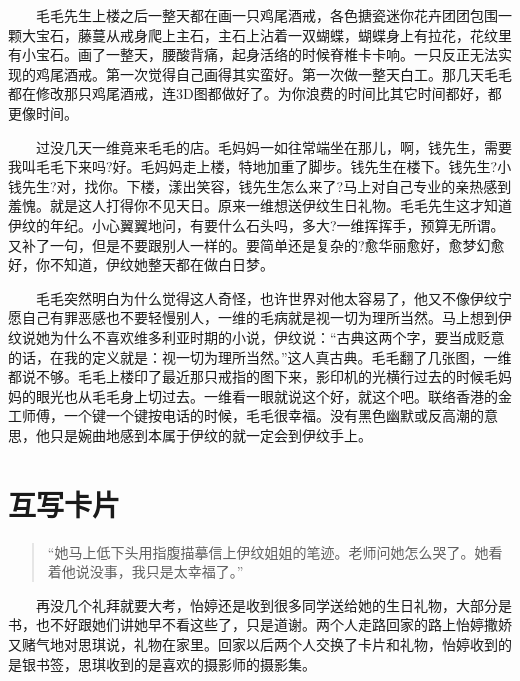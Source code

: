 \documentclass[12pt,UTF8]{ctexbook}
\begin{document}
　　毛毛先生上楼之后一整天都在画一只鸡尾酒戒，各色搪瓷迷你花卉团团包围一颗大宝石，藤蔓从戒身爬上主石，主石上沾着一双蝴蝶，蝴蝶身上有拉花，花纹里有小宝石。画了一整天，腰酸背痛，起身活络的时候脊椎卡卡响。一只反正无法实现的鸡尾酒戒。第一次觉得自己画得其实蛮好。第一次做一整天白工。那几天毛毛都在修改那只鸡尾酒戒，连3D图都做好了。为你浪费的时间比其它时间都好，都更像时间。

　　过没几天一维竟来毛毛的店。毛妈妈一如往常端坐在那儿，啊，钱先生，需要我叫毛毛下来吗?好。毛妈妈走上楼，特地加重了脚步。钱先生在楼下。钱先生?小钱先生?对，找你。下楼，漾出笑容，钱先生怎么来了?马上对自己专业的亲热感到羞愧。就是这人打得你不见天日。原来一维想送伊纹生日礼物。毛毛先生这才知道伊纹的年纪。小心翼翼地问，有要什么石头吗，多大?一维挥挥手，预算无所谓。又补了一句，但是不要跟别人一样的。要简单还是复杂的?愈华丽愈好，愈梦幻愈好，你不知道，伊纹她整天都在做白日梦。

　　毛毛突然明白为什么觉得这人奇怪，也许世界对他太容易了，他又不像伊纹宁愿自己有罪恶感也不要轻慢别人，一维的毛病就是视一切为理所当然。马上想到伊纹说她为什么不喜欢维多利亚时期的小说，伊纹说：\enquote{古典这两个字，要当成贬意的话，在我的定义就是：视一切为理所当然。}这人真古典。毛毛翻了几张图，一维都说不够。毛毛上楼印了最近那只戒指的图下来，影印机的光横行过去的时候毛妈妈的眼光也从毛毛身上切过去。一维看一眼就说这个好，就这个吧。联络香港的金工师傅，一个键一个键按电话的时候，毛毛很幸福。没有黑色幽默或反高潮的意思，他只是婉曲地感到本属于伊纹的就一定会到伊纹手上。

\hypertarget{ux4e92ux5199ux5361ux7247}{%
\section*{互写卡片}\label{ux4e92ux5199ux5361ux7247}}

\begin{quote}
\enquote{她马上低下头用指腹描摹信上伊纹姐姐的笔迹。老师问她怎么哭了。她看着他说没事，我只是太幸福了。}
\end{quote}

　　再没几个礼拜就要大考，怡婷还是收到很多同学送给她的生日礼物，大部分是书，也不好跟她们讲她早不看这些了，只是道谢。两个人走路回家的路上怡婷撒娇又赌气地对思琪说，礼物在家里。回家以后两个人交换了卡片和礼物，怡婷收到的是银书签，思琪收到的是喜欢的摄影师的摄影集。
\end{document}
